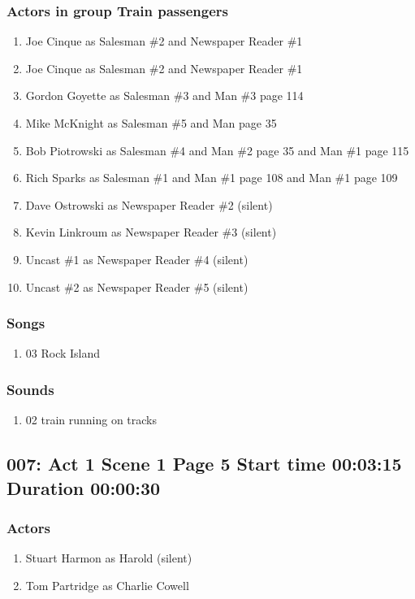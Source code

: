 \subsubsection{Actors in group Train passengers}
\begin{enumerate}
\item Joe Cinque as Salesman \#2 and Newspaper Reader \#1
\item Joe Cinque as Salesman \#2 and Newspaper Reader \#1
\item Gordon Goyette as Salesman \#3 and Man \#3 page 114
\item Mike McKnight as Salesman \#5 and Man page 35
\item Bob Piotrowski as Salesman \#4 and Man \#2 page 35 and Man \#1 page 115
\item Rich Sparks as Salesman \#1 and Man \#1 page 108 and Man \#1 page 109
\item Dave Ostrowski as Newspaper Reader \#2 (silent)
\item Kevin Linkroum as Newspaper Reader \#3 (silent)
\item Uncast \#1 as Newspaper Reader \#4 (silent)
\item Uncast \#2 as Newspaper Reader \#5 (silent)
\end{enumerate}

\subsubsection{Songs}
\begin{enumerate}
\item 03 Rock Island
\end{enumerate}\subsubsection{Sounds}
\begin{enumerate}
\item 02 train running on tracks
\end{enumerate}
\subsection{007: Act 1 Scene 1 Page 5 Start time 00:03:15 Duration 00:00:30}

\subsubsection{Actors}
\begin{enumerate}
\item Stuart Harmon as Harold (silent)
\item Tom Partridge as Charlie Cowell
\end{enumerate}
